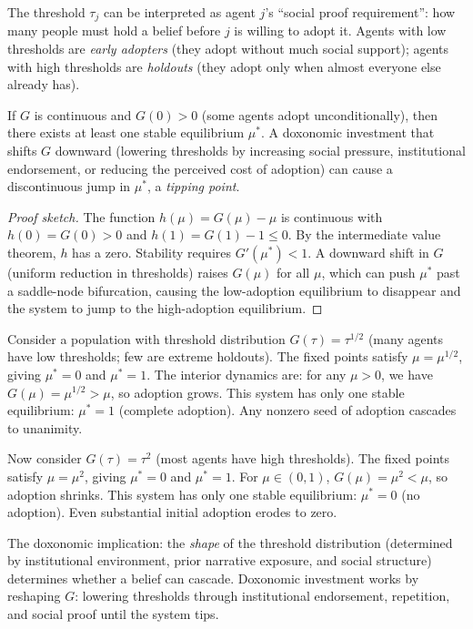 The threshold $\tau_j$ can be interpreted as agent $j$'s ``social proof requirement'': how many people must hold a belief before $j$ is willing to adopt it.
Agents with low thresholds are \emph{early adopters} (they adopt without much social support); agents with high thresholds are \emph{holdouts} (they adopt only when almost everyone else already has).

\begin{theorem}
\label{thm:tipping}
If $G$ is continuous and $G(0) > 0$ (some agents adopt unconditionally), then there exists at least one stable equilibrium $\mu^*$.
A doxonomic investment that shifts $G$ downward (lowering thresholds by increasing social pressure, institutional endorsement, or reducing the perceived cost of adoption) can cause a discontinuous jump in $\mu^*$, a \emph{tipping point}.
\end{theorem}

\begin{proof}[Proof sketch]
The function $h(\mu) = G(\mu) - \mu$ is continuous with $h(0) = G(0) > 0$ and $h(1) = G(1) - 1 \leq 0$.
By the intermediate value theorem, $h$ has a zero.
Stability requires $G'(\mu^*) < 1$.
A downward shift in $G$ (uniform reduction in thresholds) raises $G(\mu)$ for all $\mu$, which can push $\mu^*$ past a saddle-node bifurcation, causing the low-adoption equilibrium to disappear and the system to jump to the high-adoption equilibrium.
\end{proof}

\begin{example}
\label{ex:tipping}
Consider a population with threshold distribution $G(\tau) = \tau^{1/2}$ (many agents have low thresholds; few are extreme holdouts).
The fixed points satisfy $\mu = \mu^{1/2}$, giving $\mu^* = 0$ and $\mu^* = 1$.
The interior dynamics are: for any $\mu > 0$, we have $G(\mu) = \mu^{1/2} > \mu$, so adoption grows.
This system has only one stable equilibrium: $\mu^* = 1$ (complete adoption).
Any nonzero seed of adoption cascades to unanimity.

Now consider $G(\tau) = \tau^2$ (most agents have high thresholds).
The fixed points satisfy $\mu = \mu^2$, giving $\mu^* = 0$ and $\mu^* = 1$.
For $\mu \in (0,1)$, $G(\mu) = \mu^2 < \mu$, so adoption shrinks.
This system has only one stable equilibrium: $\mu^* = 0$ (no adoption).
Even substantial initial adoption erodes to zero.

The doxonomic implication: the \emph{shape} of the threshold distribution (determined by institutional environment, prior narrative exposure, and social structure) determines whether a belief can cascade.
Doxonomic investment works by reshaping $G$: lowering thresholds through institutional endorsement, repetition, and social proof until the system tips.
\end{example}

